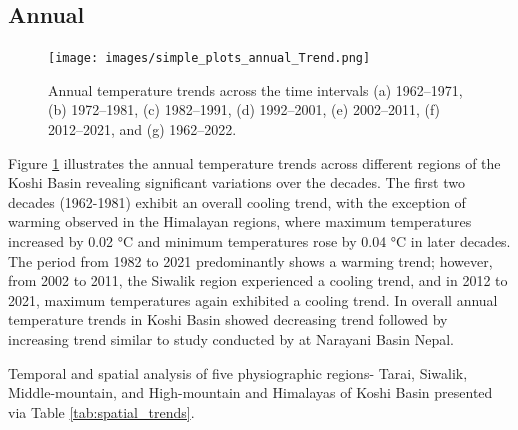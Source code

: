 \subsection*{Annual}

\begin{figure}[H] 
  \centering
  \texttt{[image: images/simple\_plots\_annual\_Trend.png]}  
  \caption{Annual temperature trends across the time intervals (a) 1962–1971, (b) 1972–1981, (c) 1982–1991, (d) 1992–2001, (e) 2002–2011, (f) 2012–2021, and (g) 1962–2022.} 
  \label{fig:Annual_temperature_trends}  
\end{figure}

Figure \ref{fig:Annual_temperature_trends} illustrates the annual temperature trends across different regions of the Koshi Basin revealing significant variations over the decades. The first two decades (1962-1981) exhibit an overall cooling trend, with the exception of warming observed in the Himalayan regions, where maximum temperatures increased by 0.02 °C and minimum temperatures rose by 0.04 °C in later decades. The period from 1982 to 2021 predominantly shows a warming trend; however, from 2002 to 2011, the Siwalik region experienced a cooling trend, and in 2012 to 2021, maximum temperatures again exhibited a cooling trend. In overall annual temperature trends in Koshi Basin showed decreasing trend followed by increasing trend similar to study conducted by \textcite{chand_trend_2019} at Narayani Basin Nepal. 


Temporal and spatial analysis of five physiographic regions- Tarai, Siwalik, Middle-mountain, and High-mountain and Himalayas of Koshi Basin presented via Table \ref{tab:spatial_trends}.

